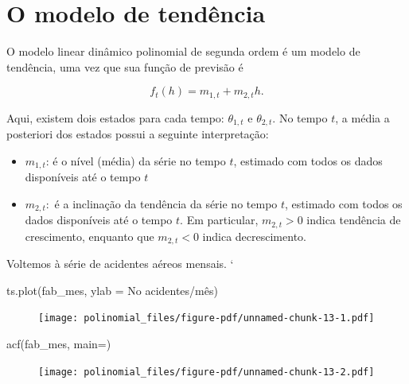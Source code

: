 \documentclass[
  letterpaper,
  DIV=11,
  numbers=noendperiod]{scrreprt}
\newenvironment{Shaded}{\begin{snugshade}}{\end{snugshade}}
\newcommand{\AttributeTok}[1]{\textcolor[rgb]{0.40,0.45,0.13}{#1}}
\newcommand{\FunctionTok}[1]{\textcolor[rgb]{0.28,0.35,0.67}{#1}}
\newcommand{\NormalTok}[1]{\textcolor[rgb]{0.00,0.23,0.31}{#1}}
\newcommand{\StringTok}[1]{\textcolor[rgb]{0.13,0.47,0.30}{#1}}
\begin{document}
\hypertarget{o-modelo-de-tenduxeancia}{%
\section{O modelo de tendência}\label{o-modelo-de-tenduxeancia}}

O modelo linear dinâmico polinomial de segunda ordem é um modelo de
tendência, uma vez que sua função de previsão é

\[f_t(h)=m_{1,t}+m_{2,t}h.\]

Aqui, existem dois estados para cada tempo: \(\theta_{1,t}\) e
\(\theta_{2,t}\). No tempo \(t\), a média a posteriori dos estados
possui a seguinte interpretação:

\begin{itemize}
\item
  \(m_{1,t}\): é o nível (média) da série no tempo \(t\), estimado com
  todos os dados disponíveis até o tempo \(t\)
\item
  \(m_{2,t}:\) é a inclinação da tendência da série no tempo \(t\),
  estimado com todos os dados disponíveis até o tempo \(t\). Em
  particular, \(m_{2,t}>0\) indica tendência de crescimento, enquanto
  que \(m_{2,t}<0\) indica decrescimento.
\end{itemize}

Voltemos à série de acidentes aéreos mensais. `

\begin{Shaded}
\begin{Highlighting}[]
\FunctionTok{ts.plot}\NormalTok{(fab\_mes, }\AttributeTok{ylab =} \StringTok{\textquotesingle{}No acidentes/mês\textquotesingle{}}\NormalTok{)}
\end{Highlighting}
\end{Shaded}

\begin{figure}[H]

{\centering \texttt{[image: polinomial\_files/figure-pdf/unnamed-chunk-13-1.pdf]}

}

\end{figure}

\begin{Shaded}
\begin{Highlighting}[]
\FunctionTok{acf}\NormalTok{(fab\_mes, }\AttributeTok{main=}\StringTok{\textquotesingle{}\textquotesingle{}}\NormalTok{)}
\end{Highlighting}
\end{Shaded}

\begin{figure}[H]

{\centering \texttt{[image: polinomial\_files/figure-pdf/unnamed-chunk-13-2.pdf]}

}

\end{figure}
\end{document}
